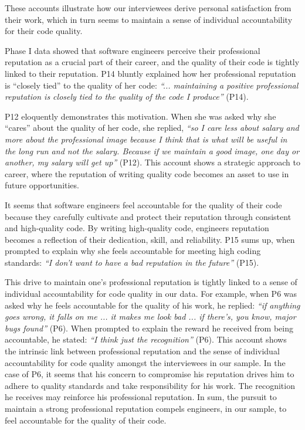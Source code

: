 These accounts illustrate how our interviewees derive personal satisfaction from their work, which in turn seems to maintain a sense of individual accountability for their code quality.

 Phase I data showed that software engineers perceive their professional reputation as a crucial part of their career, and the quality of their code is tightly linked to their reputation. P14 bluntly explained how her professional reputation is ``closely tied'' to the quality of her code: \emph{``... maintaining a positive professional reputation is closely tied to the quality of the code I produce''} (P14).

P12 eloquently demonstrates this motivation. When she was asked why she ``cares'' about the quality of her code, she replied, \emph{``so I care less about salary and more about the professional image because I think that is what will be useful in the long run and not the salary. Because if we maintain a good image, one day or another, my salary will get up''} (P12). This account shows a strategic approach to career, where the reputation of writing quality code becomes an asset to use in future opportunities. 

It seems that software engineers feel accountable for the quality of their code because they carefully cultivate and protect their reputation through consistent and high-quality code. By writing high-quality code, engineers reputation becomes a reflection of their dedication, skill, and reliability. P15 sums up, when prompted to explain why she feels accountable for meeting high coding standards: \emph{``I don't want to have a bad reputation in the future''} (P15).

This drive to maintain one's professional reputation is tightly linked to a sense of individual accountability for code quality in our data. For example, when P6 was asked why he feels accountable for the quality of his work, he replied: \emph{``if anything goes wrong, it falls on me ... it makes me look bad ... if there's, you know, major bugs found''} (P6). When prompted to explain the reward he received from being accountable, he stated: \emph{``I think just the recognition''} (P6). This account shows the intrinsic link between professional reputation and the sense of individual accountability for code quality amongst the interviewees in our sample. In the case of P6, it seems that his concern to compromise his reputation drives him to adhere to quality standards and take responsibility for his work. The recognition he receives may reinforce his professional reputation. In sum, the pursuit to maintain a strong professional reputation compels engineers, in our sample, to feel accountable for the quality of their code.

